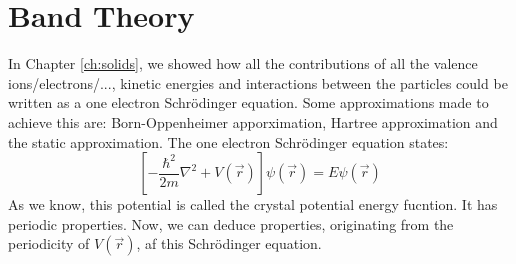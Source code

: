 \chapter{Band Theory}
\begin{RECAP}
In Chapter \ref{ch:solids}, we showed how all the contributions of all the valence ions/electrons/..., kinetic energies and interactions between the particles could be written as a one electron Schrödinger equation. Some approximations made to achieve this are: Born-Oppenheimer apporximation, Hartree approximation and the static approximation.
The one electron Schrödinger equation states:
\begin{equation}
	\left[-\frac{\hbar^2}{2m}\nabla^2 + V(\vec{r})\right]\psi(\vec{r}) = E\psi(\vec{r}) \label{eqn:schrodinger_tbu}
\end{equation}
As we know, this potential is called the crystal potential energy fucntion. It has periodic properties. Now, we can deduce properties, originating from the periodicity of $V(\vec{r})$, af this Schrödinger equation.


\end{RECAP}
